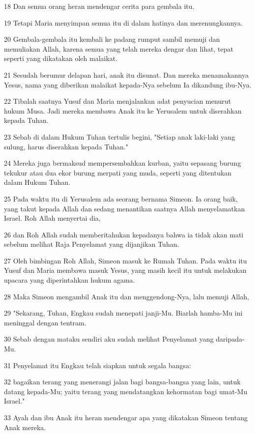 \par 18 Dan semua orang heran mendengar cerita para gembala itu.
\par 19 Tetapi Maria menyimpan semua itu di dalam hatinya dan merenungkannya.
\par 20 Gembala-gembala itu kembali ke padang rumput sambil memuji dan memuliakan Allah, karena semua yang telah mereka dengar dan lihat, tepat seperti yang dikatakan oleh malaikat.
\par 21 Sesudah berumur delapan hari, anak itu disunat. Dan mereka menamakannya Yesus, nama yang diberikan malaikat kepada-Nya sebelum Ia dikandung ibu-Nya.
\par 22 Tibalah saatnya Yusuf dan Maria menjalankan adat penyucian menurut hukum Musa. Jadi mereka membawa Anak itu ke Yerusalem untuk diserahkan kepada Tuhan.
\par 23 Sebab di dalam Hukum Tuhan tertulis begini, "Setiap anak laki-laki yang sulung, harus diserahkan kepada Tuhan."
\par 24 Mereka juga bermaksud mempersembahkan kurban, yaitu sepasang burung tekukur atau dua ekor burung merpati yang muda, seperti yang ditentukan dalam Hukum Tuhan.
\par 25 Pada waktu itu di Yerusalem ada seorang bernama Simeon. Ia orang baik, yang takut kepada Allah dan sedang menantikan saatnya Allah menyelamatkan Israel. Roh Allah menyertai dia,
\par 26 dan Roh Allah sudah memberitahukan kepadanya bahwa ia tidak akan mati sebelum melihat Raja Penyelamat yang dijanjikan Tuhan.
\par 27 Oleh bimbingan Roh Allah, Simeon masuk ke Rumah Tuhan. Pada waktu itu Yusuf dan Maria membawa masuk Yesus, yang masih kecil itu untuk melakukan upacara yang diperintahkan hukum agama.
\par 28 Maka Simeon mengambil Anak itu dan menggendong-Nya, lalu memuji Allah,
\par 29 "Sekarang, Tuhan, Engkau sudah menepati janji-Mu. Biarlah hamba-Mu ini meninggal dengan tentram.
\par 30 Sebab dengan mataku sendiri aku sudah melihat Penyelamat yang daripada-Mu.
\par 31 Penyelamat itu Engkau telah siapkan untuk segala bangsa:
\par 32 bagaikan terang yang menerangi jalan bagi bangsa-bangsa yang lain, untuk datang kepada-Mu; yaitu terang yang mendatangkan kehormatan bagi umat-Mu Israel."
\par 33 Ayah dan ibu Anak itu heran mendengar apa yang dikatakan Simeon tentang Anak mereka.
